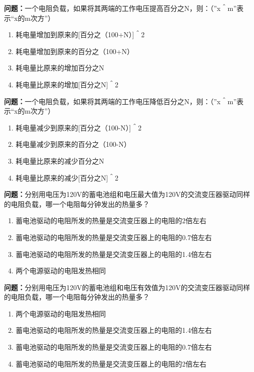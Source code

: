 \bigskip


\noindent\textbf{问题：}一个电阻负载，如果将其两端的工作电压提高百分之N，则：（”x＾m”表示“x的m次方”）
\begin{enumerate}[label=\Alph*), leftmargin=3em]
\item 耗电量增加到原来的[百分之（100+N）]＾2
\item 耗电量增加到原来的百分之（100+N）
\item 耗电量比原来的增加百分之N
\item 耗电量比原来的增加[百分之N]＾2
\end{enumerate}

\bigskip


\noindent\textbf{问题：}一个电阻负载，如果将其两端的工作电压降低百分之N，则：（”x＾m”表示“x的m次方”）
\begin{enumerate}[label=\Alph*), leftmargin=3em]
\item 耗电量减少到原来的[百分之（100-N）]＾2
\item 耗电量减少到原来的百分之（100-N）
\item 耗电量比原来的减少百分之N
\item 耗电量比原来的减少[百分之N]＾2
\end{enumerate}

\bigskip


\noindent\textbf{问题：}分别用电压为120V的蓄电池组和电压最大值为120V的交流变压器驱动同样的电阻负载，哪一个电阻每分钟发出的热量多？
\begin{enumerate}[label=\Alph*), leftmargin=3em]
\item 蓄电池驱动的电阻所发的热量是交流变压器上的电阻的2倍左右
\item 蓄电池驱动的电阻所发的热量是交流变压器上的电阻的0.7倍左右
\item 蓄电池驱动的电阻所发的热量是交流变压器上的电阻的1.4倍左右
\item 两个电源驱动的电阻发热相同
\end{enumerate}

\bigskip


\noindent\textbf{问题：}分别用电压为120V的蓄电池组和电压有效值为120V的交流变压器驱动同样的电阻负载，哪一个电阻每分钟发出的热量多？
\begin{enumerate}[label=\Alph*), leftmargin=3em]
\item 两个电源驱动的电阻发热相同
\item 蓄电池驱动的电阻所发的热量是交流变压器上的电阻的1.4倍左右
\item 蓄电池驱动的电阻所发的热量是交流变压器上的电阻的0.7倍左右
\item 蓄电池驱动的电阻所发的热量是交流变压器上的电阻的2倍左右
\end{enumerate}

